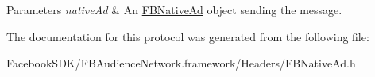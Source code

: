 \begin{DoxyParams}{Parameters}
{\em native\-Ad} & An \hyperlink{interface_f_b_native_ad}{F\-B\-Native\-Ad} object sending the message. \\
\hline
\end{DoxyParams}


The documentation for this protocol was generated from the following file\-:\begin{DoxyCompactItemize}
\item 
Facebook\-S\-D\-K/\-F\-B\-Audience\-Network.\-framework/\-Headers/F\-B\-Native\-Ad.\-h\end{DoxyCompactItemize}
